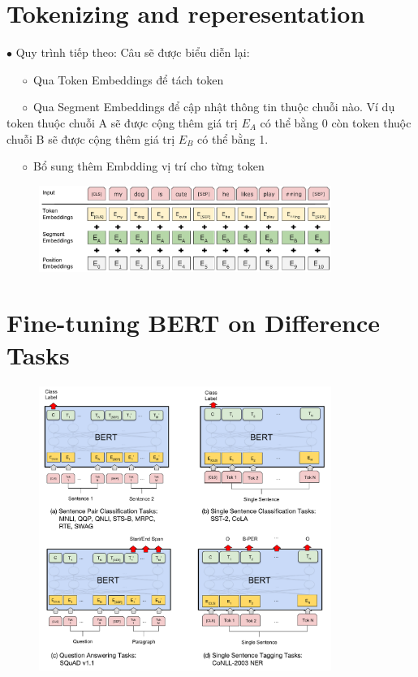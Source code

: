 \documentclass[final,letterpaper,twoside,12pt]{report}
\begin{document}
\section{Tokenizing and reperesentation}
$\bullet$ Quy trình tiếp theo: Câu sẽ được biểu diễn lại:

$\hspace*{0.5cm} \circ$ Qua Token Embeddings để tách token

$\hspace*{0.5cm} \circ$ Qua Segment Embeddings để cập nhật thông tin thuộc chuỗi nào. Ví dụ token thuộc chuỗi A sẽ được cộng thêm giá trị $E_A $ có thể bằng 0 còn token thuộc chuỗi B sẽ được cộng thêm giá trị $E_B$ có thể bằng 1.

$\hspace*{0.5cm} \circ$ Bổ sung thêm Embdding vị trí cho từng token
\begin{figure}[ht]
	\begin{center}
		\hspace{-0.2in}
		\includegraphics[width=360px]{Input_Emebeddings.pdf}
	\end{center}
\end{figure}

\section{Fine-tuning BERT on Difference Tasks}

\begin{figure}[h]
	\begin{center}
		\includegraphics[width=0.85\textwidth]{BERT_fine_tune.pdf}
	\end{center}
\end{figure}
\end{document}
